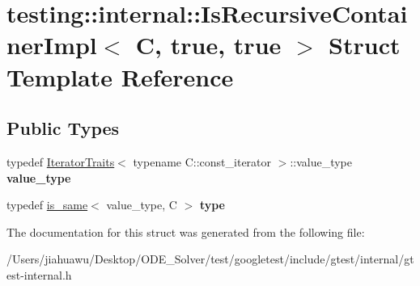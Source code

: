 \hypertarget{structtesting_1_1internal_1_1_is_recursive_container_impl_3_01_c_00_01true_00_01true_01_4}{}\section{testing\+:\+:internal\+:\+:Is\+Recursive\+Container\+Impl$<$ C, true, true $>$ Struct Template Reference}
\label{structtesting_1_1internal_1_1_is_recursive_container_impl_3_01_c_00_01true_00_01true_01_4}
\subsection*{Public Types}
\begin{DoxyCompactItemize}
\item 
\mbox{\label{structtesting_1_1internal_1_1_is_recursive_container_impl_3_01_c_00_01true_00_01true_01_4_a76c73d6db05e50f49ca21946be5ed8c0}} 
typedef \mbox{\hyperlink{structtesting_1_1internal_1_1_iterator_traits}{Iterator\+Traits}}$<$ typename C\+::const\+\_\+iterator $>$\+::value\+\_\+type {\bfseries value\+\_\+type}
\item 
\mbox{\label{structtesting_1_1internal_1_1_is_recursive_container_impl_3_01_c_00_01true_00_01true_01_4_a6bf4fa07dd1c22c5d0ca4ed99c546e9c}} 
typedef \mbox{\hyperlink{structtesting_1_1internal_1_1is__same}{is\+\_\+same}}$<$ value\+\_\+type, C $>$ {\bfseries type}
\end{DoxyCompactItemize}


The documentation for this struct was generated from the following file\+:\begin{DoxyCompactItemize}
\item 
/\+Users/jiahuawu/\+Desktop/\+O\+D\+E\+\_\+\+Solver/test/googletest/include/gtest/internal/gtest-\/internal.\+h\end{DoxyCompactItemize}
